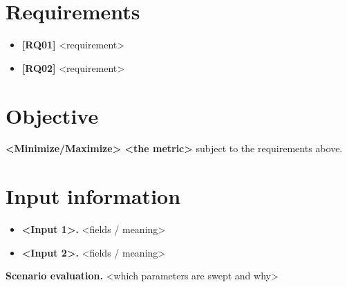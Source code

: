 \section{Requirements}
%
\begin{itemize}
  \item \textbf{[RQ01]} <requirement>
  \item \textbf{[RQ02]} <requirement>
\end{itemize}

\section{Objective}
\textbf{<Minimize/Maximize> <the metric>} subject to the requirements above.

\section{Input information}
\begin{itemize}
  \item \textbf{<Input 1>.} <fields / meaning>
  \item \textbf{<Input 2>.} <fields / meaning>
\end{itemize}

\medskip
\noindent\textbf{Scenario evaluation.} <which parameters are swept and why>
